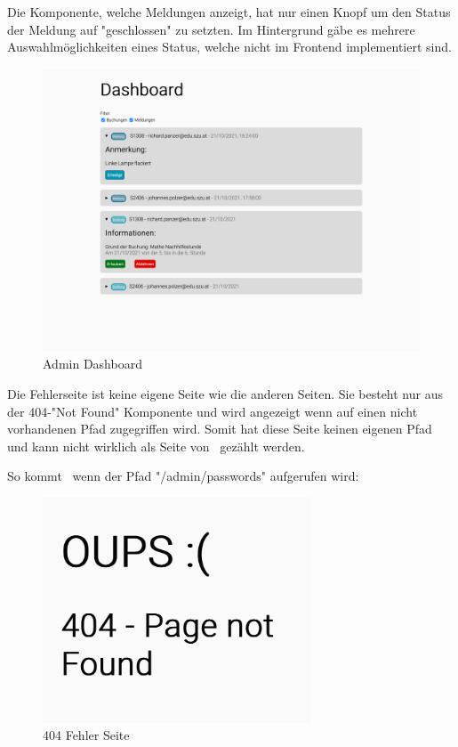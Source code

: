 Die Komponente, welche Meldungen anzeigt, hat nur einen Knopf um den Status der Meldung auf "geschlossen" zu setzten. Im Hintergrund gäbe es mehrere Auswahlmöglichkeiten eines Status, welche nicht im Frontend implementiert sind.

\begin{figure}[H]
    \centering
    \includegraphics[width=120mm]{media/WebComponents/AdminSeite_light.png}
    \caption{Admin Dashboard}
    \label{fig:admindashboard}
\end{figure}

\begin{minipage}{\textwidth}
    
    Die Fehlerseite ist keine eigene Seite wie die anderen Seiten. Sie besteht nur aus der 404-"Not Found" Komponente und wird angezeigt wenn auf einen nicht vorhandenen Pfad zugegriffen wird. Somit hat diese Seite keinen eigenen Pfad und kann nicht wirklich als Seite von \ZELIA\ gezählt werden.
\end{minipage}

So kommt \zb\ wenn der Pfad "{\ttfamily /admin/passwords}" aufgerufen wird:
    
\begin{figure}[H]
    \centering
    \includegraphics[width=80mm]{media/WebComponents/404.png}
    \caption{404 Fehler Seite}
\end{figure}